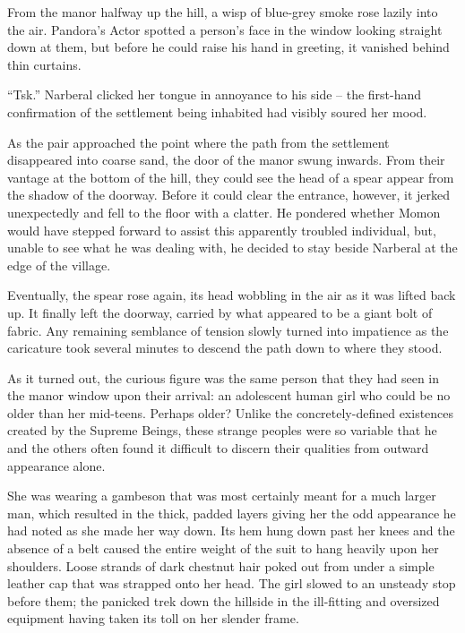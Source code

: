  

From the manor halfway up the hill, a wisp of blue-grey smoke rose lazily into the air. Pandora’s Actor spotted a person’s face in the window looking straight down at them, but before he could raise his hand in greeting, it vanished behind thin curtains.

 

“Tsk.” Narberal clicked her tongue in annoyance to his side – the first-hand confirmation of the settlement being inhabited had visibly soured her mood.

 

As the pair approached the point where the path from the settlement disappeared into coarse sand, the door of the manor swung inwards. From their vantage at the bottom of the hill, they could see the head of a spear appear from the shadow of the doorway. Before it could clear the entrance, however, it jerked unexpectedly and fell to the floor with a clatter. He pondered whether Momon would have stepped forward to assist this apparently troubled individual, but, unable to see what he was dealing with, he decided to stay beside Narberal at the edge of the village.

 

Eventually, the spear rose again, its head wobbling in the air as it was lifted back up. It finally left the doorway, carried by what appeared to be a giant bolt of fabric. Any remaining semblance of tension slowly turned into impatience as the caricature took several minutes to descend the path down to where they stood.

 

As it turned out, the curious figure was the same person that they had seen in the manor window upon their arrival: an adolescent human girl who could be no older than her mid-teens. Perhaps older? Unlike the concretely-defined existences created by the Supreme Beings, these strange peoples were so variable that he and the others often found it difficult to discern their qualities from outward appearance alone.

 

She was wearing a gambeson that was most certainly meant for a much larger man, which resulted in the thick, padded layers giving her the odd appearance he had noted as she made her way down. Its hem hung down past her knees and the absence of a belt caused the entire weight of the suit to hang heavily upon her shoulders. Loose strands of dark chestnut hair poked out from under a simple leather cap that was strapped onto her head. The girl slowed to an unsteady stop before them; the panicked trek down the hillside in the ill-fitting and oversized equipment having taken its toll on her slender frame.

